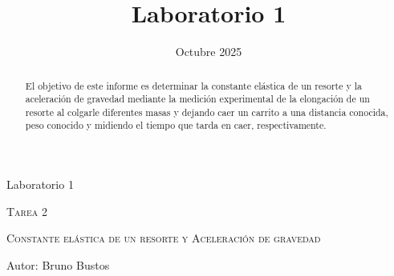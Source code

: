 \documentclass{article}
\title{Laboratorio 1}
\date{Octubre 2025}
\begin{document}
\fancyfoot[C]{}          
\fancyhead{}    

\begin{center}
\large Laboratorio 1 \\
\vspace{0.3cm}
{\scshape\Huge Tarea 2 \par}
\vspace{0.5cm}
{\scshape\Large Constante elástica de un resorte y Aceleración de gravedad \par}
\vspace{1.5cm}
{\large Autor: Bruno Bustos}
\vspace{0.3cm}
\large 
\\ 
\end{center}
\vspace{1cm}

\begin{abstract}

    El objetivo de este informe es determinar la constante elástica de un resorte y la aceleración
    de gravedad mediante la medición experimental de la elongación de un resorte al colgarle diferentes
    masas y dejando caer un carrito a una distancia conocida, peso conocido y midiendo el tiempo que
    tarda en caer, respectivamente.

\end{abstract}
\end{document}
